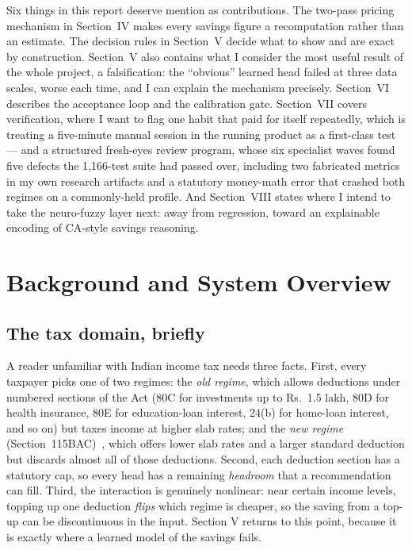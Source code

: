 \documentclass[conference]{IEEEtran}
\begin{document}
Six things in this report deserve mention as contributions. The
two-pass pricing mechanism in Section~IV makes every savings figure a
recomputation rather than an estimate. The decision rules in
Section~V decide what to show and are exact by construction.
Section~V also contains what I consider the most useful result of the
whole project, a falsification: the ``obvious'' learned head failed at
three data scales, worse each time, and I can explain the mechanism
precisely. Section~VI describes the acceptance loop and the
calibration gate. Section~VII covers verification, where I want to
flag one habit that paid for itself repeatedly, which is treating a
five-minute manual session in the running product as a first-class
test --- and a structured fresh-eyes review program, whose six
specialist waves found five defects the 1{,}166-test suite had passed
over, including two fabricated metrics in my own research artifacts
and a statutory money-math error that crashed both regimes on a
commonly-held profile. And Section~VIII states where I intend to take
the neuro-fuzzy layer next: away from regression, toward an
explainable encoding of CA-style savings reasoning.

\section{Background and System Overview}
\subsection{The tax domain, briefly}
A reader unfamiliar with Indian income tax needs three facts. First,
every taxpayer picks one of two regimes: the \emph{old regime}, which
allows deductions under numbered sections of the Act (80C for
investments up to Rs.~1.5 lakh, 80D for health insurance, 80E for
education-loan interest, 24(b) for home-loan interest, and so on) but
taxes income at higher slab rates; and the \emph{new regime}
(Section~115BAC)~\cite{ita1961}, which offers lower slab rates and a larger standard
deduction but discards almost all of those deductions. Second, each
deduction section has a statutory cap, so every head has a remaining
\emph{headroom} that a recommendation can fill. Third, the interaction
is genuinely nonlinear: near certain income levels, topping up one
deduction \emph{flips} which regime is cheaper, so the saving from a
top-up can be discontinuous in the input. Section V returns to this
point, because it is exactly where a learned model of the savings
fails.
\end{document}
